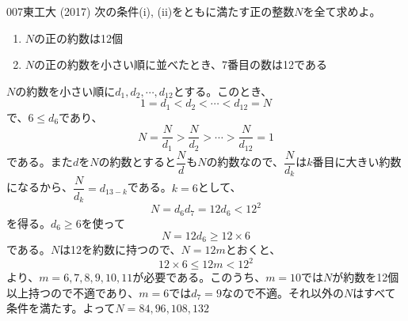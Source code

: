 \begin{prob}{007}{}{東工大 (2017)}
 次の条件(i), (ii)をともに満たす正の整数$N$を全て求めよ。
 \begin{enumerate}[label=\roman*,align=CenterWithParen]
  \item $N$の正の約数は12個
  \item $N$の正の約数を小さい順に並べたとき、7番目の数は12である
 \end{enumerate}
\end{prob}

$N$の約数を小さい順に$d_1, d_2,\cdots, d_{12}$とする。このとき、
\[ 1=d_1<d_2<\cdots<d_{12}=N \]
で、$6\leq d_6$であり、
\[ N=\frac{N}{d_1}>\frac{N}{d_2}>\cdots>\frac{N}{d_{12}}=1 \]
である。また$d$を$N$の約数とすると$\dfrac{N}{d}$も$N$の約数なので、$\dfrac{N}{d_k}$は$k$番目に大きい約数になるから、$\dfrac{N}{d_k}=d_{13-k}$である。$k=6$として、
\[ N=d_6d_7=12d_6<12^2 \]
を得る。$d_6\geq 6$を使って
\[ N=12d_6\geq 12\times 6 \]
である。$N$は12を約数に持つので、$N=12m$とおくと、
\[ 12\times 6\leq 12m < 12^2 \]
より、$m=6, 7, 8, 9, 10, 11$が必要である。このうち、$m=10$では$N$が約数を12個以上持つので不適であり、$m=6$では$d_7=9$なので不適。それ以外の$N$はすべて条件を満たす。よって$N=84, 96, 108, 132$